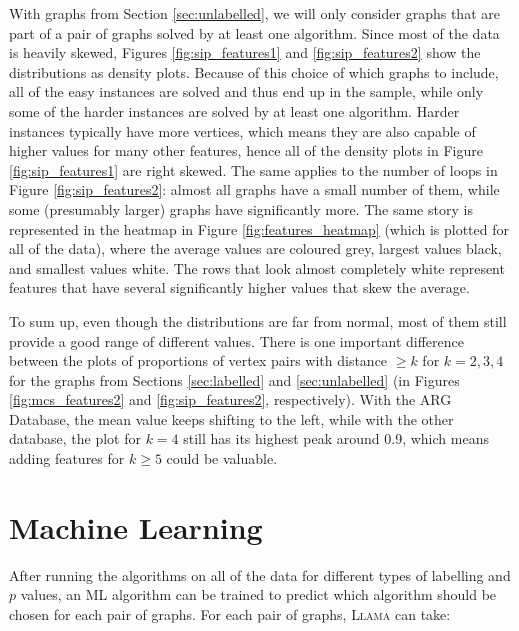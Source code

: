 \documentclass{l4proj}
\theoremstyle{definition}
\theoremstyle{remark}
\begin{document}
With graphs from Section \ref{sec:unlabelled}, we will only consider graphs that
are part of a pair of graphs solved by at least one algorithm. Since most of the
data is heavily skewed, Figures \ref{fig:sip_features1} and
\ref{fig:sip_features2} show the distributions as density plots. Because of this
choice of which graphs to include, all of the easy instances are solved and thus
end up in the sample, while only some of the harder instances are solved by at
least one algorithm. Harder instances typically have more vertices, which means
they are also capable of higher values for many other features, hence all of the
density plots in Figure \ref{fig:sip_features1} are right skewed. The same
applies to the number of loops in Figure \ref{fig:sip_features2}: almost all
graphs have a small number of them, while some (presumably larger) graphs have
significantly more. The same story is represented in the heatmap in Figure
\ref{fig:features_heatmap} (which is plotted for all of the data), where the
average values are coloured grey, largest values black, and smallest values
white. The rows that look almost completely white represent features that have
several significantly higher values that skew the average.

To sum up, even though the distributions are far from normal, most of them still
provide a good range of different values. There is one important difference
between the plots of proportions of vertex pairs with distance $\ge k$ for $k =
2, 3, 4$ for the graphs from Sections \ref{sec:labelled} and \ref{sec:unlabelled} (in Figures
\ref{fig:mcs_features2} and \ref{fig:sip_features2}, respectively). With
the ARG Database, the mean value keeps shifting to the left, while with the
other database, the plot for $k = 4$ still has its highest peak around 0.9,
which means adding features for $k \ge 5$ could be valuable.

\chapter{Machine Learning}
After running the algorithms on all of the data for different types of labelling
and $p$ values, an ML algorithm can be trained to predict which algorithm should
be chosen for each pair of graphs. For each pair of graphs, \textsc{Llama}
\cite{llama} can take:
\end{document}
